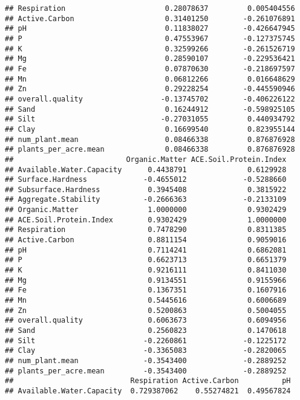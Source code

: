 \documentclass[]{article}
\begin{document}
\begin{verbatim}
## Respiration                       0.28078637         0.005404556
## Active.Carbon                     0.31401250        -0.261076891
## pH                                0.11838027        -0.426647945
## P                                 0.47553967        -0.127375745
## K                                 0.32599266        -0.261526719
## Mg                                0.28590107        -0.229536421
## Fe                                0.07870630        -0.218697597
## Mn                                0.06812266         0.016648629
## Zn                                0.29228254        -0.445590946
## overall.quality                  -0.13745702        -0.406226122
## Sand                              0.16244912        -0.598925105
## Silt                             -0.27031055         0.440934792
## Clay                              0.16699540         0.823955144
## num_plant.mean                    0.08466338         0.876876928
## plants_per_acre.mean              0.08466338         0.876876928
##                          Organic.Matter ACE.Soil.Protein.Index
## Available.Water.Capacity      0.4438791              0.6129928
## Surface.Hardness             -0.4655012             -0.5288660
## Subsurface.Hardness           0.3945408              0.3815922
## Aggregate.Stability          -0.2666363             -0.2133109
## Organic.Matter                1.0000000              0.9302429
## ACE.Soil.Protein.Index        0.9302429              1.0000000
## Respiration                   0.7478290              0.8311385
## Active.Carbon                 0.8811154              0.9059016
## pH                            0.7114241              0.6862081
## P                             0.6623713              0.6651379
## K                             0.9216111              0.8411030
## Mg                            0.9134551              0.9155966
## Fe                            0.1367351              0.1607916
## Mn                            0.5445616              0.6006689
## Zn                            0.5200863              0.5004055
## overall.quality               0.6063673              0.6094956
## Sand                          0.2560823              0.1470618
## Silt                         -0.2260861             -0.1225172
## Clay                         -0.3365083             -0.2820065
## num_plant.mean               -0.3543400             -0.2889252
## plants_per_acre.mean         -0.3543400             -0.2889252
##                           Respiration Active.Carbon          pH
## Available.Water.Capacity  0.729387062    0.55274821  0.49567824

\end{verbatim}
\end{document}
